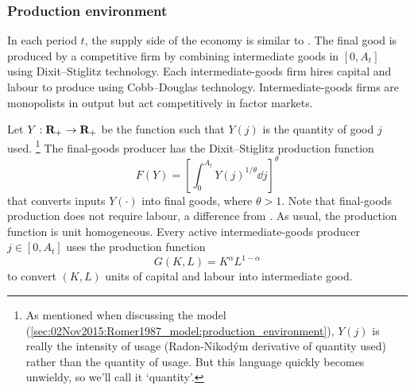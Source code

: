 \documentclass[11pt,letterpaper,reqno,oneside]{article}
\begin{document}
\subsubsection{Production environment}
\label{sec:11Nov2015:comin_gertler:production_environment}

In each period $t$, the supply side of the economy is similar to \textcite{Romer1987}. The final good is produced by a competitive firm by combining intermediate goods in $[0,A_t]$ using Dixit--Stiglitz technology. Each intermediate-goods firm hires capital and labour to produce using Cobb--Douglas technology. Intermediate-goods firms are monopolists in output but act competitively in factor markets.

Let $Y : \mathbf{R}_+ \to \mathbf{R}_+$ be the function such that $Y(j)$ is the quantity of good $j$ used.%
	\footnote{As mentioned when discussing the \textcite{Romer1987} model (\cref{sec:02Nov2015:Romer1987_model:production_environment}), $Y(j)$ is really the intensity of usage (Radon-Nikod\'{y}m derivative of quantity used) rather than the quantity of usage. But this language quickly becomes unwieldy, so we'll call it `quantity'.}
The final-goods producer has the Dixit--Stiglitz production function
%
\begin{equation*}
	F(Y) = \left[ \int_0^{A_t} Y(j)^{1/\theta} \dd j \right]^\theta 
\end{equation*}
%
that converts inputs $Y(\cdot)$ into final goods, where $\theta>1$. Note that final-goods production does not require labour, a difference from \textcite{Romer1987}. As usual, the production function is unit homogeneous. Every active intermediate-goods producer $j \in [0,A_t]$ uses the production function
%
\begin{equation*}
	G( K, L ) = K^\alpha L^{1-\alpha} 
\end{equation*}
%
to convert $(K,L)$ units of capital and labour into intermediate good.
\end{document}
